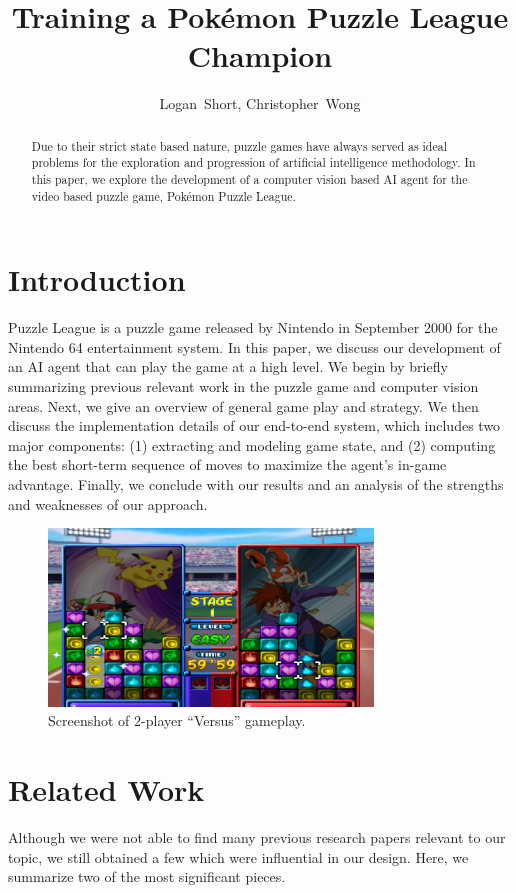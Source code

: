 \documentclass[12pt]{IEEEtran}
\begin{document}
\title{Training a Pok\'{e}mon Puzzle League Champion}
\author{Logan~Short, Christopher~Wong}%
\maketitle

\begin{abstract}
Due to their strict state based nature, puzzle games have always served as ideal problems for the exploration and progression of artificial intelligence methodology. In this paper, we explore the development of a computer vision based AI agent for the video based puzzle game, Pok\'{e}mon Puzzle League.
\end{abstract}

\section{Introduction}
 Puzzle League is a puzzle game released by Nintendo in September 2000 for the Nintendo 64 entertainment system. In this paper, we discuss our development of an AI agent that can play the game at a high level. We begin by briefly summarizing previous relevant work in the puzzle game and computer vision areas. Next, we give an overview of general game play and strategy. We then discuss the implementation details of our end-to-end system, which includes two major components: (1) extracting and modeling game state, and (2) computing the best short-term sequence of moves to maximize the agent's in-game advantage. Finally, we conclude with our results and an analysis of the strengths and weaknesses of our approach.

\begin{figure}[h!]
\centerline{\includegraphics[width=3.4in]{game.png}}
\caption{Screenshot of $2$-player ``Versus'' gameplay.}
\label{fig:game}
\end{figure}

\section{Related Work}
Although we were not able to find many previous research papers relevant to our topic, we still obtained a few which were influential in our design. Here, we summarize two of the most significant pieces.
\end{document}
